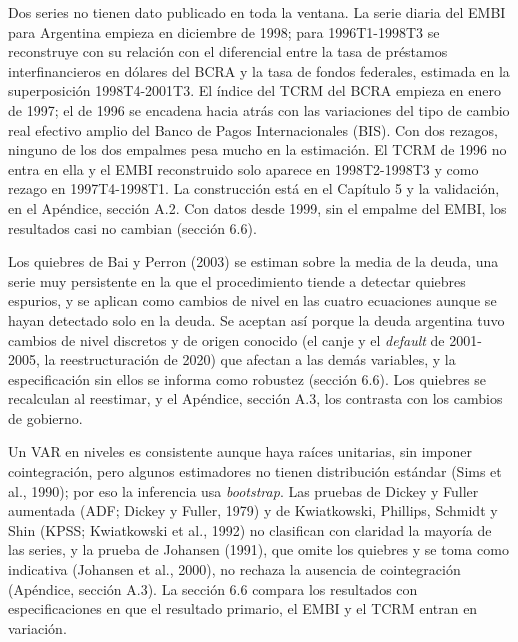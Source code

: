 Dos series no tienen dato publicado en toda la ventana. La serie diaria
del EMBI para Argentina empieza en diciembre de 1998; para 1996T1-1998T3
se reconstruye con su relación con el diferencial entre la tasa de
préstamos interfinancieros en dólares del BCRA y la tasa de fondos
federales, estimada en la superposición 1998T4-2001T3. El índice del
TCRM del BCRA empieza en enero de 1997; el de 1996 se encadena hacia
atrás con las variaciones del tipo de cambio real efectivo amplio del
Banco de Pagos Internacionales (BIS). Con dos rezagos, ninguno de los
dos empalmes pesa mucho en la estimación. El TCRM de 1996 no entra en
ella y el EMBI reconstruido solo aparece en 1998T2-1998T3 y como rezago
en 1997T4-1998T1. La construcción está en el Capítulo 5 y la validación,
en el Apéndice, sección A.2. Con datos desde 1999, sin el empalme del
EMBI, los resultados casi no cambian (sección 6.6).

Los quiebres de Bai y Perron (2003) se estiman sobre la media de la
deuda, una serie muy persistente en la que el procedimiento tiende a
detectar quiebres espurios, y se aplican como cambios de nivel en las
cuatro ecuaciones aunque se hayan detectado solo en la deuda. Se aceptan
así porque la deuda argentina tuvo cambios de nivel discretos y de
origen conocido (el canje y el \emph{default} de 2001-2005, la
reestructuración de 2020) que afectan a las demás variables, y la
especificación sin ellos se informa como robustez (sección 6.6). Los
quiebres se recalculan al reestimar, y el Apéndice, sección A.3, los
contrasta con los cambios de gobierno.

Un VAR en niveles es consistente aunque haya raíces unitarias, sin
imponer cointegración, pero algunos estimadores no tienen distribución
estándar (Sims et al., 1990); por eso la inferencia usa
\emph{bootstrap}. Las pruebas de Dickey y Fuller aumentada (ADF; Dickey
y Fuller, 1979) y de Kwiatkowski, Phillips, Schmidt y Shin (KPSS;
Kwiatkowski et al., 1992) no clasifican con claridad la mayoría de las
series, y la prueba de Johansen (1991), que omite los quiebres y se toma
como indicativa (Johansen et al., 2000), no rechaza la ausencia de
cointegración (Apéndice, sección A.3). La sección 6.6 compara los
resultados con especificaciones en que el resultado primario, el EMBI y
el TCRM entran en variación.

